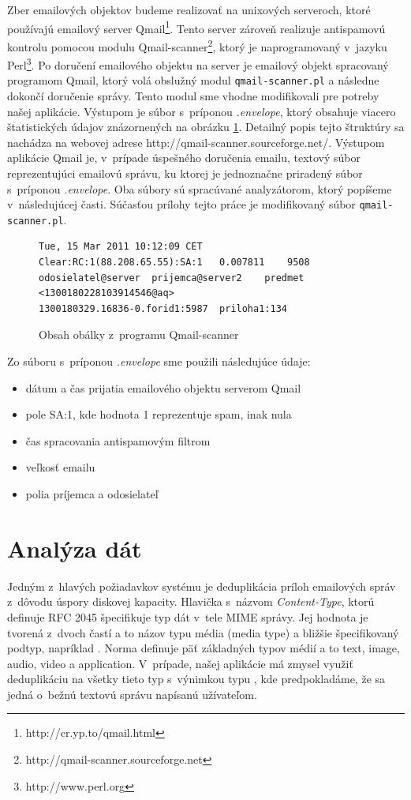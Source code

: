 \documentclass[11pt,twoside,a4paper]{book}
\begin{document}
Zber emailových objektov budeme realizovať na unixových serveroch, ktoré používajú emailový server Qmail\footnote{http://cr.yp.to/qmail.html}. Tento server zároveň realizuje antispamovú kontrolu pomocou modulu Qmail-scanner\footnote{http://qmail-scanner.sourceforge.net}, ktorý je naprogramovaný v~jazyku Perl\footnote{http://www.perl.org}. Po doručení emailového objektu na server je emailový objekt spracovaný programom Qmail, ktorý volá obslužný modul \verb|qmail-scanner.pl| a následne dokončí doručenie správy. Tento modul sme vhodne modifikovali pre potreby našej aplikácie. Výstupom je súbor s~príponou \emph{.envelope}, ktorý obsahuje viacero štatistických údajov znázornených na obrázku \ref{fig:envelope}. Detailný popis tejto štruktúry sa nachádza na webovej adrese http://qmail-scanner.sourceforge.net/. Výstupom aplikácie Qmail je, v~prípade úspešného doručenia emailu, textový súbor reprezentujúci emailovú správu, ku ktorej je jednoznačne priradený súbor s~príponou \emph{.envelope}. Oba súbory sú spracúvané analyzátorom, ktorý popíšeme v~následujúcej časti. Súčasťou prílohy tejto práce je modifikovaný súbor \verb|qmail-scanner.pl|.

\begin{figure}[h]
\begin{verbatim}
Tue, 15 Mar 2011 10:12:09 CET	Clear:RC:1(88.208.65.55):SA:1	0.007811	9508	odosielatel@server	prijemca@server2	predmet	<1300180228103914546@aq>	
1300180329.16836-0.forid1:5987	priloha1:134
\end{verbatim}
 \caption{Obsah obálky z~programu Qmail-scanner}
 \label{fig:envelope}
\end{figure}

\noindent
Zo súboru s~príponou \emph{.envelope} sme použili následujúce údaje:
\begin{itemize}
 \item dátum a čas prijatia emailového objektu serverom Qmail
 \item pole SA:1, kde hodnota 1 reprezentuje spam, inak nula
 \item čas spracovania antispamovým filtrom
 \item veľkosť emailu
 \item polia príjemca a odosielateľ
\end{itemize}


\section{Analýza dát}
Jedným z~hlavých požiadavkov systému je deduplikácia príloh emailových správ z~dôvodu úspory diskovej kapacity. Hlavička s~názvom \emph{Content-Type}, ktorú definuje RFC 2045 špecifikuje typ dát v~tele MIME správy. Jej hodnota je tvorená z~dvoch častí a to názov typu média (media type) a bližšie špecifikovaný podtyp, napríklad \emph{}. Norma definuje päť základných typov médií a to text, image, audio, video a application. V~prípade, našej aplikácie má zmysel využiť deduplikáciu na všetky tieto typ s~výnimkou typu \emph{}, kde predpokladáme, že sa jedná o~bežnú textovú správu napísanú užívateľom.
\end{document}
